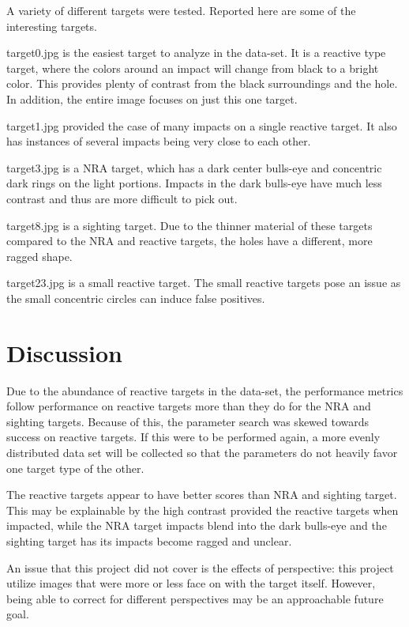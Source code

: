\documentclass{article}
\begin{document}
A variety of different targets were tested. Reported here are some of the interesting targets.

target0.jpg is the easiest target to analyze in the data-set. It is a reactive type target,
where the colors around an impact will change from black to a bright color. This provides
plenty of contrast from the black surroundings and the hole. In addition, the entire image
focuses on just this one target.

target1.jpg provided the case of many impacts on a single reactive target. It also has
instances of several impacts being very close to each other.

target3.jpg is a NRA target, which has a dark center bulls-eye and concentric dark rings
on the light portions. Impacts in the dark bulls-eye have much less contrast and thus are
more difficult to pick out.

target8.jpg is a sighting target. Due to the thinner material of these targets compared
to the NRA and reactive targets, the holes have a different, more ragged shape.

target23.jpg is a small reactive target. The small reactive targets pose an issue
as the small concentric circles can induce false positives.


\section{Discussion}
\label{sec:discussion}
Due to the abundance of reactive targets in the data-set, the performance metrics follow
performance on reactive targets more than they do for the NRA and sighting targets. Because of this,
the parameter search was skewed towards success on reactive targets.
If this were to be performed again, a more evenly distributed data set will be collected so that the
parameters do not heavily favor one target type of the other.

The reactive targets appear to have better scores than NRA and sighting target. This may be explainable
by the high contrast provided the reactive targets when impacted, while the NRA target impacts blend
into the dark bulls-eye and the sighting target has its impacts become ragged and unclear.

An issue that this project did not cover is the effects of perspective: this project utilize images
that were more or less face on with the target itself. However, being able to correct for different
perspectives may be an approachable future goal.
\end{document}

